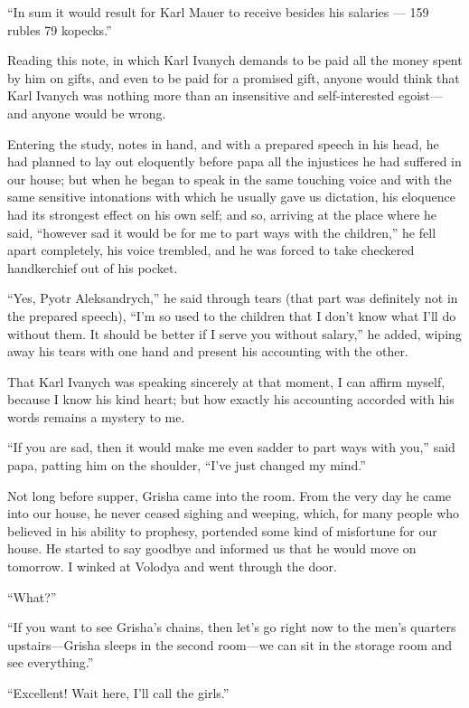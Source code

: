 ``In sum it would result for Karl Mauer to receive besides his salaries --- 159 rubles 79 kopecks.'' %

Reading this note, in which Karl Ivanych demands to be paid all the money spent by him on gifts, and even to be paid for a promised gift, anyone would think that Karl Ivanych was nothing more than an insensitive and self-interested egoist---and anyone would be wrong.

Entering the study, notes in hand, and with a prepared speech in his head, he had planned to lay out eloquently before papa all the injustices he had suffered in our house; but when he began to speak in the same touching voice and with the same sensitive intonations with which he usually gave us dictation, his eloquence had its strongest effect on his own self; and so, arriving at the place where he said, ``however sad it would be for me to part ways with the children,'' he fell apart completely, his voice trembled, and he was forced to take checkered handkerchief out of his pocket. %

``Yes, Pyotr Aleksandrych,'' he said through tears (that part was definitely not in the prepared speech), ``I'm so used to the children that I don't know what I'll do without them. It should be better if I serve you without salary,'' he added, wiping away his tears with one hand and present his accounting with the other. %

That Karl Ivanych was speaking sincerely at that moment, I can affirm myself, because I know his kind heart; but how exactly his accounting accorded with his words remains a mystery to me.

``If you are sad, then it would make me even sadder to part ways with you,'' said papa, patting him on the shoulder, ``I've just changed my mind.''

Not long before supper, Grisha came into the room. From the very day he came into our house, he never ceased sighing and weeping, which, for many people who believed in his ability to prophesy, portended some kind of misfortune for our house. He started to say goodbye and informed us that he would move on tomorrow. I winked at Volodya and went through the door.

``What?'' %

``If you want to see Grisha's chains, then let's go right now to the men's quarters upstairs---Grisha sleeps in the second room---we can sit in the storage room and see everything.'' %

``Excellent! Wait here, I'll call the girls.'' %

